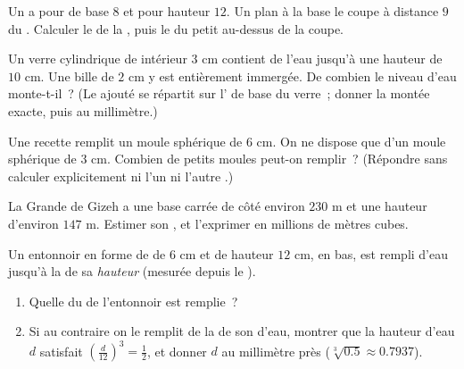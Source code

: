 \begin{exercise}[$\star\star$]\label{exo:g9:solids:5}
Un  a pour  de base $8$ et pour hauteur $12$. Un plan 
à la base le coupe à distance $9$ du . Calculer le  de la
, puis le  du petit  au-dessus de la coupe.
\end{exercise}

\begin{exercise}[$\star\star$]\label{exo:g9:solids:6}
Un verre cylindrique de  intérieur $3$ cm contient de l'eau jusqu'à
une hauteur de $10$ cm. Une bille de  $2$ cm y est entièrement
immergée. De combien le niveau d'eau monte-t-il~? (Le  ajouté se
répartit sur l' de base du verre~; donner la montée exacte, puis
 au millimètre.)
\end{exercise}

\begin{exercise}[$\star\star$]\label{exo:g9:solids:7}
Une recette remplit un moule sphérique de  $6$ cm. On ne dispose que
d'un moule sphérique de  $3$ cm. Combien de petits moules peut-on
remplir~? (Répondre sans calculer explicitement ni l'un ni l'autre
.)
\end{exercise}

\begin{exercise}[$\star\star$]\label{exo:g9:solids:8}
La Grande  de Gizeh a une base carrée de côté environ $230$ m et
une hauteur d'environ $147$ m. Estimer son , et l'exprimer en
millions de mètres cubes.
\end{exercise}

\begin{exercise}[$\star\star\star$]\label{exo:g9:solids:9}
Un entonnoir en forme de  de  $6$ cm et de hauteur $12$ cm,
 en bas, est rempli d'eau jusqu'à la  de sa \emph{hauteur}
(mesurée depuis le ).
\begin{enumerate}
  \item Quelle  du  de l'entonnoir est remplie~?
  \item Si au contraire on le remplit de la  de son \emph{}
        d'eau, montrer que la hauteur d'eau $d$ satisfait
        $\left(\frac{d}{12}\right)^3 = \frac12$, et donner $d$ au
        millimètre près ($\sqrt[3]{0.5} \approx 0.7937$).
\end{enumerate}
\end{exercise}

